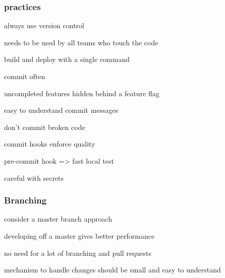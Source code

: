 \documentclass[a4paper,14pt, twocolumn]{extarticle}
\begin{document}
		\subsubsection{practices}
			\begin{compactitem}
				\item always use version control 
				\item needs to be used by all teams who touch the code 
				\item build and deploy with a single command 
				\item commit often
				\begin{compactitem}
					\item uncompleted features hidden behind a feature flag 
				\end{compactitem}
				\item easy to understand commit messages 
				\item don’t commit broken code 
				\item commit hooks enforce quality 
					\begin{compactitem}
						\item pre-commit hook => fast local test 
					\end{compactitem}
				\item careful with secrets
			\end{compactitem}
		\subsubsection{Branching}
			\begin{compactitem}
				\item consider a master branch approach
				\item developing off a master gives better performance
				\begin{compactitem}
					\item no need for a lot of branching and pull requests 
					\item mechanism to handle changes should be small and easy to understand
				\end{compactitem}
			\end{compactitem}
		
\end{document}
